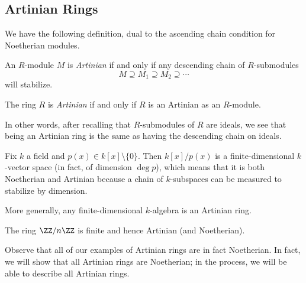 \subsection{Artinian Rings}
We have the following definition, dual to the ascending chain condition for Noetherian modules.
\begin{definition}
	An $R$-module $M$ is \textit{Artinian} if and only if any descending chain of $R$-submodules
	\[M\supseteq M_1\supseteq M_2\supseteq\cdots\]
	will stabilize.
\end{definition}
\begin{definition}
	The ring $R$ is \textit{Artinian} if and only if $R$ is an Artinian as an $R$-module.
\end{definition}
In other words, after recalling that $R$-submodules of $R$ are ideals, we see that being an Artinian ring is the same as having the descending chain on ideals.
\begin{example}
	Fix $k$ a field and $p(x)\in k[x]\setminus\{0\}$. Then $k[x]/p(x)$ is a finite-dimensional $k$-vector space (in fact, of dimension $\deg p$), which means that it is both Noetherian and Artinian because a chain of $k$-subspaces can be measured to stabilize by dimension.
\end{example}
\begin{example}
	More generally, any finite-dimensional $k$-algebra is an Artinian ring.
\end{example}
\begin{example}
	The ring $\ZZ/n\ZZ$ is finite and hence Artinian (and Noetherian).
\end{example}
Observe that all of our examples of Artinian rings are in fact Noetherian. In fact, we will show that all Artinian rings are Noetherian; in the process, we will be able to describe all Artinian rings.

